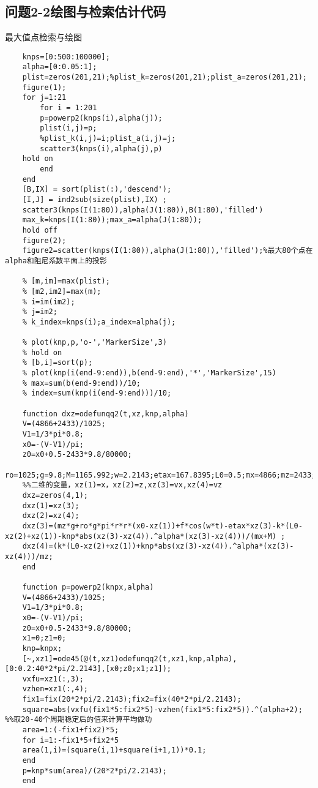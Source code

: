 \documentclass{article}
\numberwithin{equation}{subsection}
\begin{document}
\subsection{问题2-2绘图与检索估计代码}
最大值点检索与绘图
\begin{lstlisting}
    knps=[0:500:100000];
    alpha=[0:0.05:1];
    plist=zeros(201,21);%plist_k=zeros(201,21);plist_a=zeros(201,21);
    figure(1);
    for j=1:21
        for i = 1:201
        p=powerp2(knps(i),alpha(j));
        plist(i,j)=p;
        %plist_k(i,j)=i;plist_a(i,j)=j;
        scatter3(knps(i),alpha(j),p)
    hold on
        end
    end
    [B,IX] = sort(plist(:),'descend');
    [I,J] = ind2sub(size(plist),IX) ;
    scatter3(knps(I(1:80)),alpha(J(1:80)),B(1:80),'filled')
    max_k=knps(I(1:80));max_a=alpha(J(1:80));
    hold off 
    figure(2);
    figure2=scatter(knps(I(1:80)),alpha(J(1:80)),'filled');%最大80个点在alpha和阻尼系数平面上的投影
    
    % [m,im]=max(plist);
    % [m2,im2]=max(m);
    % i=im(im2);
    % j=im2;
    % k_index=knps(i);a_index=alpha(j);
    
    % plot(knp,p,'o-','MarkerSize',3)
    % hold on
    % [b,i]=sort(p);
    % plot(knp(i(end-9:end)),b(end-9:end),'*','MarkerSize',15)
    % max=sum(b(end-9:end))/10;
    % index=sum(knp(i(end-9:end)))/10;
       
    function dxz=odefunqq2(t,xz,knp,alpha)
    V=(4866+2433)/1025; 
    V1=1/3*pi*0.8; 
    x0=-(V-V1)/pi;
    z0=x0+0.5-2433*9.8/80000;
    ro=1025;g=9.8;M=1165.992;w=2.2143;etax=167.8395;L0=0.5;mx=4866;mz=2433;r=1;f=4890;k=80000;
    %%二维的变量，xz(1)=x，xz(2)=z,xz(3)=vx,xz(4)=vz 
    dxz=zeros(4,1); 
    dxz(1)=xz(3); 
    dxz(2)=xz(4);
    dxz(3)=(mz*g+ro*g*pi*r*r*(x0-xz(1))+f*cos(w*t)-etax*xz(3)-k*(L0-xz(2)+xz(1))-knp*abs(xz(3)-xz(4)).^alpha*(xz(3)-xz(4)))/(mx+M) ;
    dxz(4)=(k*(L0-xz(2)+xz(1))+knp*abs(xz(3)-xz(4)).^alpha*(xz(3)-xz(4)))/mz; 
    end
    
    function p=powerp2(knpx,alpha)
    V=(4866+2433)/1025;
    V1=1/3*pi*0.8;
    x0=-(V-V1)/pi;
    z0=x0+0.5-2433*9.8/80000;
    x1=0;z1=0;
    knp=knpx;
    [~,xz1]=ode45(@(t,xz1)odefunqq2(t,xz1,knp,alpha),[0:0.2:40*2*pi/2.2143],[x0;z0;x1;z1]);
    vxfu=xz1(:,3);
    vzhen=xz1(:,4);
    fix1=fix(20*2*pi/2.2143);fix2=fix(40*2*pi/2.2143);
    square=abs(vxfu(fix1*5:fix2*5)-vzhen(fix1*5:fix2*5)).^(alpha+2); %%取20-40个周期稳定后的值来计算平均做功
    area=1:(-fix1+fix2)*5;
    for i=1:-fix1*5+fix2*5
    area(1,i)=(square(i,1)+square(i+1,1))*0.1;
    end
    p=knp*sum(area)/(20*2*pi/2.2143);
    end
    
\end{lstlisting}
\end{document}
